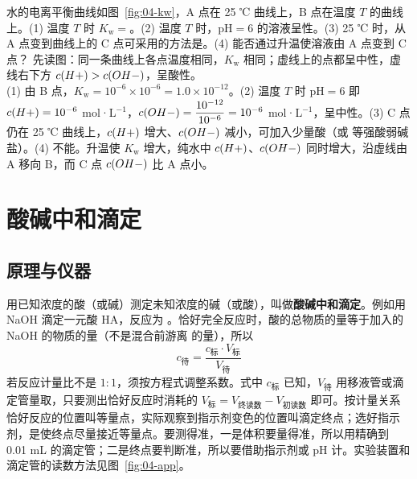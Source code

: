 \begin{liti}[综合]
水的电离平衡曲线如图~\ref{fig:04-kw}，A 点在 25 ℃ 曲线上，B 点在温度 $T$ 的曲线上。(1) 温度 $T$ 时 $K_\text{w}=$\tk。(2) 温度 $T$ 时，pH$=6$ 的溶液呈\tk{}性。(3) 25 ℃ 时，从 A 点变到曲线上的 C 点可采用的方法是\tk。(4) 能否通过升温使溶液由 A 点变到 C 点？
\tcblower
\silu 先读图：同一条曲线上各点温度相同，$K_\text{w}$ 相同；虚线上的点都呈中性，虚线右下方 $c(H+)>c(OH-)$，呈酸性。\\
\jie (1) 由 B 点，$K_\text{w}=10^{-6}\times10^{-6}=1.0\times10^{-12}$。(2) 温度 $T$ 时 pH$=6$ 即 $c(H+)=10^{-6}$ mol·L$^{-1}$，$c(OH-)=\dfrac{10^{-12}}{10^{-6}}=10^{-6}$ mol·L$^{-1}$，呈中性。(3) C 点仍在 25 ℃ 曲线上，$c(H+)$ 增大、$c(OH-)$ 减小，可加入少量酸（或  等强酸弱碱盐）。(4) 不能。升温使 $K_\text{w}$ 增大，纯水中 $c(H+)$、$c(OH-)$ 同时增大，沿虚线由 A 移向 B，而 C 点 $c(OH-)$ 比 A 点小。
\end{liti}

\section{酸碱中和滴定}

\subsection{原理与仪器}
用已知浓度的酸（或碱）测定未知浓度的碱（或酸），叫做\textbf{酸碱中和滴定}。例如用 NaOH 滴定一元酸 HA，反应为 。恰好完全反应时，酸的总物质的量等于加入的 NaOH 的物质的量（不是混合前游离  的量），所以
\[c_\text{待}=\frac{c_\text{标}\cdot V_\text{标}}{V_\text{待}}\]
若反应计量比不是 $1:1$，须按方程式调整系数。式中 $c_\text{标}$ 已知，$V_\text{待}$ 用移液管或滴定管量取，只要测出恰好反应时消耗的 $V_\text{标}=V_\text{终读数}-V_\text{初读数}$ 即可。按计量关系恰好反应的位置叫等量点，实际观察到指示剂变色的位置叫滴定终点；选好指示剂，是使终点尽量接近等量点。要测得准，一是体积要量得准，所以用精确到 0.01 mL 的滴定管；二是终点要判断准，所以要借助指示剂或 pH 计。实验装置和滴定管的读数方法见图~\ref{fig:04-app}。

